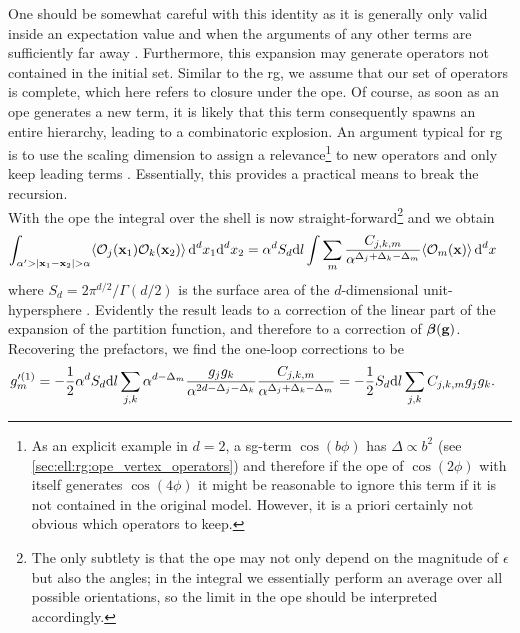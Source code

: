 One should be somewhat careful with this identity as it is generally only valid inside an expectation value and when the arguments of any other terms are sufficiently far away \cite[]{Cardy_1996}.
Furthermore, this expansion may generate operators not contained in the initial set.
Similar to the \tms{} \gls{rg}, we assume that our set of operators is complete, which here refers to closure under the \gls{ope}.
Of course, as soon as an \gls{ope} generates a new term, it is likely that this term consequently spawns an entire hierarchy, leading to a combinatoric explosion.
An argument typical for \gls{rg} is to use the scaling dimension to assign a relevance\footnote{As an explicit example in $d=2$, a \gls{sg}-term $\cos(b\phi)$ has $\Delta \propto b^2$ (see \autoref{sec:ell:rg:ope_vertex_operators}) and therefore if the \gls{ope} of $\cos(2\phi)$ with itself generates $\cos(4\phi)$ it might be reasonable to ignore this term if it is not contained in the original model. However, it is a priori certainly not obvious which operators to keep.} to new operators and only keep leading terms \cite[]{AltlandSimons}.
Essentially, this provides a practical means to break the recursion.\\
With the \gls{ope} the integral over the shell is now straight-forward\footnote{The only subtlety is that the \gls{ope} may not only depend on the magnitude of $\epsilon$ but also the angles; in the integral we essentially perform an average over all possible orientations, so the limit in the \gls{ope} should be interpreted accordingly.} and we obtain
\begin{align*}
\int_{\alpha'>|\textbf{x}_1-\textbf{x}_2|>\alpha} \bra*{\mathcal{O}_j(\textbf{x}_1) \mathcal{O}_k(\textbf{x}_2)}\,\d^dx_1 \d^dx_2 &= \alpha^d S_d \d l \int \sum_m \frac{C_{j,k,m}}{\alpha^{\Delta_j + \Delta_k - \Delta_m}} \bra*{\mathcal{O}_m(\textbf{x})}\,\d^dx
\end{align*}
where $S_d = 2\pi^{d/2} / \Gamma(d/2)$ is the surface area of the $d$-dimensional unit-hypersphere \cite[]{Cardy_1996}.
Evidently the result leads to a correction of the linear part of the expansion of the partition function, and therefore to a correction of $\bm{\beta}(\textbf{g})$.
Recovering the prefactors, we find the one-loop corrections to be
\begin{align*}
g_m'^{(1)} &= -\frac{1}{2} \alpha^d S_d \text{d} l \sum_{j,k} \alpha^{d-\Delta_m} \frac{g_jg_k}{\alpha^{2d-\Delta_j - \Delta_k}} \frac{C_{j,k,m}}{\alpha^{\Delta_j + \Delta_k - \Delta_m}} = -\frac{1}{2} S_d\text{d} l \sum_{j,k} C_{j,k,m} g_jg_k.
\end{align*}
